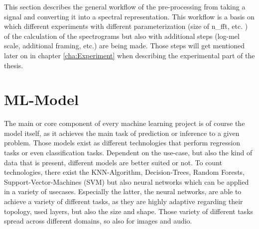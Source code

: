 This section describes the general workflow of the pre-processing from taking a signal and converting it into a spectral representation. This workflow is a basis on which different experiments with different parameterization (size of n\_fft, etc. ) of the calculation of the spectrograms but also with additional steps (log-mel scale, additional framing, etc.) are being made. Those steps will get mentioned later on in chapter \ref{cha:Experiment} when describing the experimental part of the thesis.

\section{ML-Model}
\label{sec:app_model}
The main or core component of every machine learning project is of course the model itself, as it achieves the main task of prediction or inference to a given problem. Those models exist as different technologies that perform regression tasks or even classification tasks. Dependent on the use-case, but also the kind of data that is present, different models are better suited or not. To count technologies, there exist the KNN-Algorithm, Decision-Trees, Random Forests, Support-Vector-Machines (SVM) but also neural networks which can be applied in a variety of usecases. Especially the latter, the neural networks, are able to achieve a variety of different tasks, as they are highly adaptive regarding their topology, used layers, but also the size and shape. Those variety of different tasks spread across different domains, so also for images and audio. 

